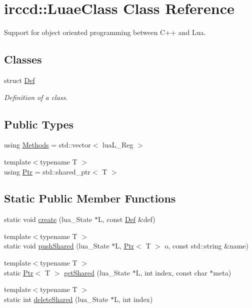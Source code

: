 \hypertarget{a00041}{\section{irccd\-:\-:Luae\-Class Class Reference}
\label{a00041}
}


Support for object oriented programming between C++ and Lua.  


\subsection*{Classes}
\begin{DoxyCompactItemize}
\item 
struct \hyperlink{a00024}{Def}
\begin{DoxyCompactList}\small\item\em Definition of a class. \end{DoxyCompactList}\end{DoxyCompactItemize}
\subsection*{Public Types}
\begin{DoxyCompactItemize}
\item 
using \hyperlink{a00041_aa25ef6181e424ebf3d1fa42df2bdf145}{Methods} = std\-::vector$<$ lua\-L\-\_\-\-Reg $>$
\item 
{\footnotesize template$<$typename T $>$ }\\using \hyperlink{a00041_a213f5d206d7bcfe4712ed9eacad9f0ce}{Ptr} = std\-::shared\-\_\-ptr$<$ T $>$
\end{DoxyCompactItemize}
\subsection*{Static Public Member Functions}
\begin{DoxyCompactItemize}
\item 
static void \hyperlink{a00041_a4f540d4aa456d5d2e739c091a93da892}{create} (lua\-\_\-\-State $\ast$L, const \hyperlink{a00024}{Def} \&def)
\item 
{\footnotesize template$<$typename T $>$ }\\static void \hyperlink{a00041_aae08da22d887cb16f2a27712d5a9d1b0}{push\-Shared} (lua\-\_\-\-State $\ast$L, \hyperlink{a00041_a213f5d206d7bcfe4712ed9eacad9f0ce}{Ptr}$<$ T $>$ o, const std\-::string \&name)
\item 
{\footnotesize template$<$typename T $>$ }\\static \hyperlink{a00041_a213f5d206d7bcfe4712ed9eacad9f0ce}{Ptr}$<$ T $>$ \hyperlink{a00041_ab54c0cd64b8c5f09f8547c08b5a70452}{get\-Shared} (lua\-\_\-\-State $\ast$L, int index, const char $\ast$meta)
\item 
{\footnotesize template$<$typename T $>$ }\\static int \hyperlink{a00041_a74effe9d447bd20f37b74be343adb63c}{delete\-Shared} (lua\-\_\-\-State $\ast$L, int index)
\end{DoxyCompactItemize}
